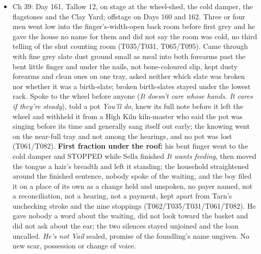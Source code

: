 \documentclass{design/chronicle}
\begin{document}
{\begin{itemize}[leftmargin=1.4em,itemsep=1pt,topsep=3pt,parsep=0pt]
\item Ch 39: Day 161, Tallow 12, on stage at the wheel-shed, the cold damper, the flagstones and the Clay Yard; offstage on Days 160 and 162. Three or four men went low into the finger’s-width-open back room before first grey and he gave the house no name for them and did not say the room was cold, no third telling of the shut counting room (T035/T031, T065/T095). Came through with fine grey slate dust ground small as meal into both forearms past the bent little finger and under the nails, not bone-coloured slip, kept dusty forearms and clean ones on one tray, asked neither which slate was broken nor whether it was a birth-slate; broken birth-slates stayed under the lowest rack. Spoke to the wheel before anyone (\emph{It doesn’t care whose hands. It cares if they’re steady}), told a pot \emph{You’ll do}, knew its full note before it left the wheel and withheld it from a High Kiln kiln-master who said the pot was singing before its time and generally sang itself out early; the knowing went on the near-full tray and not among the hearings, and no pot was lost (T061/T082). \textbf{First fraction under the roof:} his bent finger went to the cold damper and STOPPED while Sella finished \emph{It wants feeding}, then moved the tongue a hair’s breadth and left it standing; the household straightened around the finished sentence, nobody spoke of the waiting, and the boy filed it on a place of its own as a change held and unspoken, no payer named, not a reconciliation, not a hearing, not a payment, kept apart from Tarn’s unchecking stroke and the nine stoppings (T062/T035/T031/T061/T082). He gave nobody a word about the waiting, did not look toward the basket and did not ask about the ear; the two silences stayed unjoined and the loan uncalled. \emph{He’s not Vail} sealed, promise of the foundling’s name ungiven. No new scar, possession or change of voice.

\end{itemize}

\begin{itemize}[leftmargin=1.4em,itemsep=1pt,topsep=3pt,parsep=0pt]


\end{itemize}}
\end{document}
